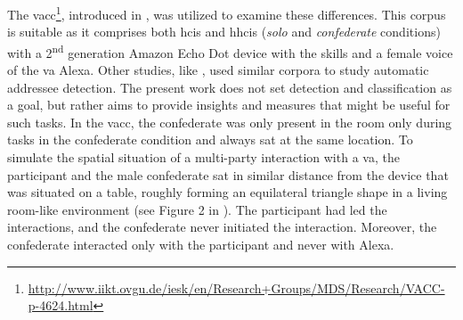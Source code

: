 The \acf{vacc}\footnote{\url{http://www.iikt.ovgu.de/iesk/en/Research+Groups/MDS/Research/VACC-p-4624.html}}, introduced in \citet{Siegert2018VACC}, was utilized to examine these differences.
This corpus is suitable as it comprises both \acp{hci} and \acp{hhci} (\emph{solo} and \emph{confederate} conditions) with a 2\textsuperscript{nd} generation Amazon Echo Dot device with the skills and a female voice of the \acf{va} Alexa.
Other studies, like \citet{Shriberg2013addressee,vanTurnhout2005identifying}, used similar corpora to study automatic addressee detection.
The present work does not set detection and classification as a goal, but rather aims to provide insights and measures that might be useful for such tasks.
In the \ac{vacc}, the confederate was only present in the room only during tasks in the confederate condition and always sat at the same location.
To simulate the spatial situation of a multi-party interaction with a \ac{va}, the participant and the male confederate sat in similar distance from the device that was situated on a table, roughly forming an equilateral triangle shape in a living room-like environment (see Figure 2 in \citet{Siegert2018VACC}).
The participant had led the interactions, and the confederate never initiated the interaction.
Moreover, the confederate interacted only with the participant and never with Alexa.


